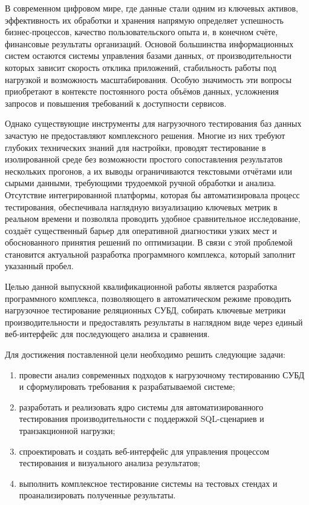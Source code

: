 \introduction %

В современном цифровом мире, где данные стали одним из ключевых активов, эффективность их обработки и хранения напрямую определяет успешность бизнес-процессов, качество пользовательского опыта и, в конечном счёте, финансовые результаты организаций. Основой большинства информационных систем остаются системы управления базами данных, от производительности которых зависит скорость отклика приложений, стабильность работы под нагрузкой и возможность масштабирования. Особую значимость эти вопросы приобретают в контексте постоянного роста объёмов данных, усложнения запросов и повышения требований к доступности сервисов.

Однако существующие инструменты для нагрузочного тестирования баз данных зачастую не предоставляют комплексного решения. Многие из них требуют глубоких технических знаний для настройки, проводят тестирование в изолированной среде без возможности простого сопоставления результатов нескольких прогонов, а их выводы ограничиваются текстовыми отчётами или сырыми данными, требующими трудоемкой ручной обработки и анализа. Отсутствие интегрированной платформы, которая бы автоматизировала процесс тестирования, обеспечивала наглядную визуализацию ключевых метрик в реальном времени и позволяла проводить удобное сравнительное исследование, создаёт существенный барьер для оперативной диагностики узких мест и обоснованного принятия решений по оптимизации. В связи с этой проблемой становится актуальной разработка программного комплекса, который заполнит указанный пробел.

Целью данной выпускной квалификационной работы является разработка программного комплекса, позволяющего в автоматическом режиме проводить нагрузочное тестирование реляционных СУБД, собирать ключевые метрики производительности и предоставлять результаты в наглядном виде через единый веб-интерфейс для последующего анализа и сравнения.

Для достижения поставленной цели необходимо решить следующие задачи:
\begin{enumerate}[label=\arabic*)]
    \item провести анализ современных подходов к нагрузочному тестированию СУБД и сформулировать требования к разрабатываемой системе;
    \item разработать и реализовать ядро системы для автоматизированного тестирования производительности с поддержкой SQL-сценариев и транзакционной нагрузки;
    \item спроектировать и создать веб-интерфейс для управления процессом тестирования и визуального анализа результатов;
    \item выполнить комплексное тестирование системы на тестовых стендах и проанализировать полученные результаты.
\end{enumerate}


